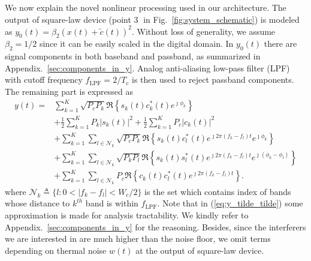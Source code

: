 \documentclass{IEEEtran}
\begin{document}


We now explain the novel nonlinear processing used in our architecture. The output of square-law device (point \textcircled{3} in Fig.~\ref{fig:system_schematic}) is modeled as $y_{0}(t) = \beta_2(x(t)+\tilde{c}(t))^2$. Without loss of generality, we assume $\beta_2 =1/2$ since it can be easily scaled in the digital domain. In $y_0(t)$ there are signal components in both baseband and passband, as summarized in Appendix.~\ref{sec:components_in_y}. Analog anti-aliasing low-pass filter (LPF) with cutoff frequency $f_{\text{LPF}} = 2/T_c$ is then used to reject passband components. The remaining part is expressed as
\begin{align}
y (t)= & \sum\limits_{k=1}^{K}\sqrt{P_cP_{k}} \Re \left\{s_{k}(t)c^*_{k}(t)e^{\jmath \phi_{k}}\right\}\nonumber\\
&+\frac{1}{2}\sum\limits_{k=1}^{K}P_{k} |s_{k}(t)|^2+\frac{1}{2}\sum\limits_{k=1}^{K}P_{c} |c_{k}(t)|^2\nonumber\\
& +\sum\limits_{k=1}^{K}\sum_{l\in \mathcal{N}_k}\sqrt{P_cP_{k}} \Re \left\{s_{k}(t)c^*_{l}(t)e^{\jmath 2\pi (f_{k}-f_{l})t}e^{\jmath \phi_{k}}\right\}\nonumber\\
&+\sum\limits_{k=1}^{K}\sum_{l\in \mathcal{N}_k} \sqrt{P_{k}P_{l}} \Re \left\{s_{k}(t)s_{l}^*(t)e^{\jmath 2\pi (f_{k}-f_{l})t}e^{\jmath \left(\phi_{k}-\phi_{l}\right)}\right\}\nonumber\\
&+\sum\limits_{k=1}^{K}\sum_{l\in \mathcal{N}_k} P_c\Re\left\{c_{k}(t)c^*_{l}(t)e^{\jmath 2\pi\left(f_{k}-f_{l}\right)t}\right\}.
\label{eq:y_tilde_tilde}
\end{align}
where $\mathcal{N}_k\triangleq \{l:0<|f_k-f_l|<W_c/2\}$ is the set which contains index of bands whose distance to $k^{th}$ band is within $f_{\text{LPF}}$. Note that in (\ref{eq:y_tilde_tilde}) some approximation is made for analysis tractability. We kindly refer to Appendix.~\ref{sec:components_in_y} for the reasoning. Besides, since the interferers we are interested in are much higher than the noise floor, we omit terms depending on thermal noise $w(t)$ at the output of square-law device.
\end{document}
